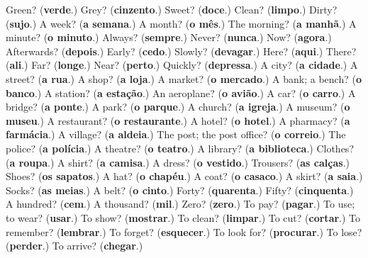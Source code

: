 \begin{tcolorbox}[breakable,colback=teal!4,colframe=teal!35!black,title={Before you move on}]
Green? (\textbf{verde}.) Grey? (\textbf{cinzento}.) Sweet? (\textbf{doce}.) Clean? (\textbf{limpo}.) Dirty? (\textbf{sujo}.) A week? (\textbf{a semana}.) A month? (\textbf{o mês}.) The morning? (\textbf{a manhã}.) A minute? (\textbf{o minuto}.) Always? (\textbf{sempre}.) Never? (\textbf{nunca}.) Now? (\textbf{agora}.) Afterwards? (\textbf{depois}.) Early? (\textbf{cedo}.) Slowly? (\textbf{devagar}.) Here? (\textbf{aqui}.) There? (\textbf{ali}.) Far? (\textbf{longe}.) Near? (\textbf{perto}.) Quickly? (\textbf{depressa}.) A city? (\textbf{a cidade}.) A street? (\textbf{a rua}.) A shop? (\textbf{a loja}.) A market? (\textbf{o mercado}.) A bank; a bench? (\textbf{o banco}.) A station? (\textbf{a estação}.) An aeroplane? (\textbf{o avião}.) A car? (\textbf{o carro}.) A bridge? (\textbf{a ponte}.) A park? (\textbf{o parque}.) A church? (\textbf{a igreja}.) A museum? (\textbf{o museu}.) A restaurant? (\textbf{o restaurante}.) A hotel? (\textbf{o hotel}.) A pharmacy? (\textbf{a farmácia}.) A village? (\textbf{a aldeia}.) The post; the post office? (\textbf{o correio}.) The police? (\textbf{a polícia}.) A theatre? (\textbf{o teatro}.) A library? (\textbf{a biblioteca}.) Clothes? (\textbf{a roupa}.) A shirt? (\textbf{a camisa}.) A dress? (\textbf{o vestido}.) Trousers? (\textbf{as calças}.) Shoes? (\textbf{os sapatos}.) A hat? (\textbf{o chapéu}.) A coat? (\textbf{o casaco}.) A skirt? (\textbf{a saia}.) Socks? (\textbf{as meias}.) A belt? (\textbf{o cinto}.) Forty? (\textbf{quarenta}.) Fifty? (\textbf{cinquenta}.) A hundred? (\textbf{cem}.) A thousand? (\textbf{mil}.) Zero? (\textbf{zero}.) To pay? (\textbf{pagar}.) To use; to wear? (\textbf{usar}.) To show? (\textbf{mostrar}.) To clean? (\textbf{limpar}.) To cut? (\textbf{cortar}.) To remember? (\textbf{lembrar}.) To forget? (\textbf{esquecer}.) To look for? (\textbf{procurar}.) To lose? (\textbf{perder}.) To arrive? (\textbf{chegar}.)
\end{tcolorbox}
